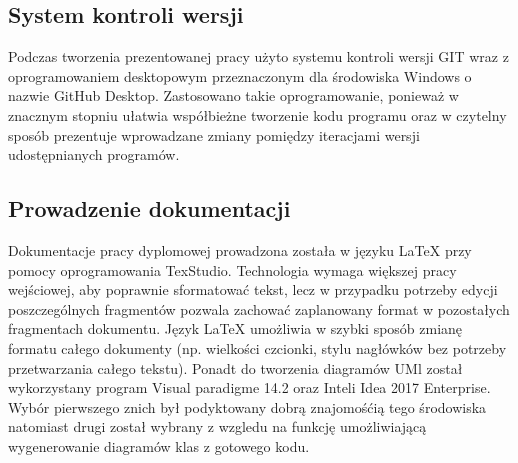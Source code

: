 \subsection{System kontroli wersji}
Podczas tworzenia prezentowanej pracy użyto systemu kontroli wersji GIT wraz z  oprogramowaniem desktopowym przeznaczonym dla środowiska Windows o nazwie GitHub Desktop. Zastosowano takie oprogramowanie, ponieważ w znacznym stopniu ułatwia współbieżne tworzenie kodu programu oraz w czytelny sposób prezentuje wprowadzane zmiany pomiędzy iteracjami wersji udostępnianych programów.

\subsection{Prowadzenie dokumentacji}
 Dokumentacje pracy dyplomowej prowadzona została w języku LaTeX przy pomocy oprogramowania TexStudio. Technologia wymaga większej pracy wejściowej, aby poprawnie sformatować tekst, lecz w przypadku potrzeby edycji poszczególnych fragmentów pozwala zachować zaplanowany format w pozostałych fragmentach dokumentu. Język LaTeX umożliwia w szybki sposób zmianę formatu całego dokumenty (np. wielkości czcionki, stylu nagłówków bez potrzeby przetwarzania całego tekstu). Ponadt do tworzenia diagramów UMl został wykorzystany program Visual paradigme 14.2 oraz Inteli Idea 2017 Enterprise. Wybór pierwszego znich był podyktowany dobrą znajomośćią tego środowiska natomiast drugi został wybrany z wzgledu na funkcję umożliwiającą wygenerowanie diagramów klas z gotowego kodu.